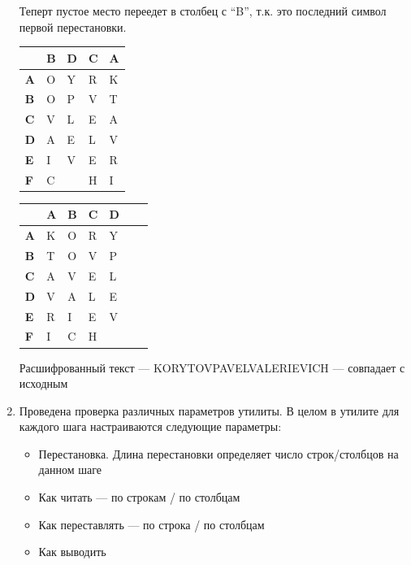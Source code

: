\documentclass[a4paper, 14pt]{extarticle}
\begin{document}
\begin{enumerate}
    Теперт пустое место переедет в столбец с ``B'', т.к. это последний символ первой перестановки.
    \begin{table}[h]
        \centering
        \begin{tabular}{@{}l|llll@{}} %
        \textbf{} & \textbf{B} & \textbf{D} & \textbf{C} & \textbf{A} \\ \midrule
        \textbf{A} & O & Y & R & K \\
        \textbf{B} & O & P & V & T \\
        \textbf{C} & V & L & E & A \\
        \textbf{D} & A & E & L & V \\
        \textbf{E} & I & V & E & R \\
        \textbf{F} & C &  & H & I
        \end{tabular}%
        \hspace{2cm}
        \begin{tabular}{@{}l|llllll@{}} %
         & \textbf{A} & \textbf{B} & \textbf{C} & \textbf{D} \\ \midrule
        \textbf{A} & K & O & R & Y \\
        \textbf{B} & T & O & V & P \\
        \textbf{C} & A & V & E & L \\
        \textbf{D} & V & A & L & E \\
        \textbf{E} & R & I & E & V \\
        \textbf{F} & I & C & H &
        \end{tabular}%
    \end{table}
    
    Расшифрованный текст --- KORYTOVPAVELVALERIEVICH --- совпадает с исходным

    \item Проведена проверка различных параметров утилиты. 
    В целом в утилите для каждого шага настраиваются следующие параметры:
    \begin{itemize}
        \item Перестановка. Длина перестановки определяет число строк/столбцов на данном шаге
        \item Как читать --- по строкам / по столбцам
        \item Как переставлять --- по строка / по столбцам
        \item Как выводить\\
    \end{itemize}


\end{enumerate}
\end{document}
